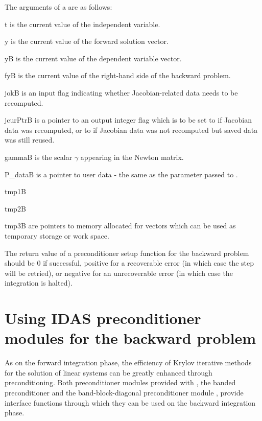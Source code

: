 {
  The arguments of a  are as follows:
  \begin{args}[jcurPtrB]
  \item[t]
    is the current value of the independent variable.
  \item[y]
    is the current value of the forward solution vector.
  \item[yB]
    is the current value of the dependent variable vector.
  \item[fyB]
    is the current value of the right-hand side of the backward problem.
  \item[jokB]
    is an input flag indicating whether Jacobian-related   
    data needs to be recomputed.
  \item[jcurPtrB]
    is a pointer to an output integer flag which is        
    to be set to  if Jacobian data was recomputed, or   
    to  if Jacobian data was not recomputed but saved data was still reused.
  \item[gammaB]
    is the scalar $\gamma$ appearing in the Newton matrix.
  \item[P\_dataB]
    is a pointer to user data - the same as the       
    parameter passed to .
  \item[tmp1B]
  \item[tmp2B]
  \item[tmp3B]
    are pointers to memory allocated for vectors which can be used           
    as temporary storage or work space.    
  \end{args}
}
{
  The return value of a preconditioner setup function for the backward
  problem should be $0$ if successful, 
  positive for a recoverable error (in which case the step will be retried),     
  or negative for an unrecoverable error (in which case the integration is halted).
}
{}

\section{Using IDAS preconditioner modules for the backward problem}

As on the forward integration phase, the efficiency of Krylov iterative methods 
for the solution of linear systems can be greatly enhanced through preconditioning.
Both preconditioner modules provided with {\sundials}, the banded
preconditioner {\idabandpre} and the band-block-diagonal preconditioner module {\idabbdpre},
provide interface functions through which they can be used on the backward integration phase.

